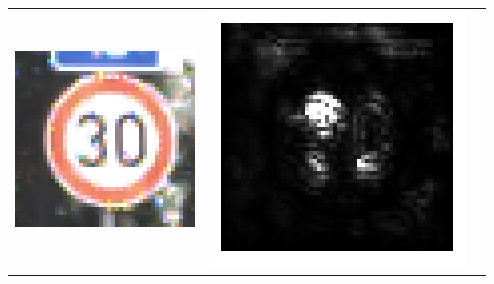\begin{table}
	\centering
	\begin{tabular}{p{4.4cm}p{4.4cm}p{4.4cm}}
		\includegraphics[width=\linewidth]{Images/AnPe/10771} \label{fig:salUrsprung}& \includegraphics[width=\linewidth]{Images/AnPe/10771_guided} &

\end{tabular}
\end{table}
